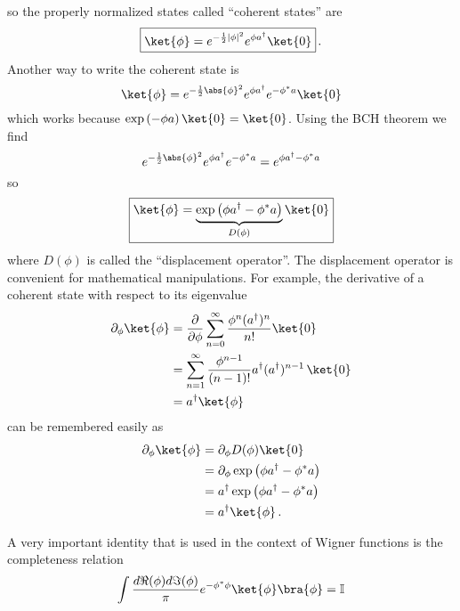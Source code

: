 so the properly normalized states called ``coherent states'' are
\begin{equation}
  \boxed{
    \ket{\phi} = e^{-\frac{1}{2} \lvert \phi \vert^2 } e^{\phi a^\dagger} \ket{0}
  }
  \, .
\end{equation}
Another way to write the coherent state is
\begin{equation*}
  \ket{\phi} = e^{-\frac{1}{2} \abs{\phi}^2} e^{\phi a^\dagger} e^{-\phi^* a} \ket{0}
\end{equation*}
which works because $\exp \left( -\phi a \right) \ket{0} = \ket{0}$.
Using the BCH theorem we find
\begin{equation*}
  e^{-\frac{1}{2} \abs{\phi}^2} e^{\phi a^\dagger} e^{-\phi^* a}
  = e^{\phi a^\dagger - \phi^* a}
\end{equation*}
so
\begin{equation}
  \boxed{
    \ket{\phi} = \underbrace{\exp \left( \phi a^\dagger - \phi^* a \right)}_{D(\phi)} \ket{0}
  }
\end{equation}
where $D(\phi)$ is called the ``displacement operator''.
The displacement operator is convenient for mathematical manipulations.
For example, the derivative of a coherent state with respect to its eigenvalue
\begin{align*}
  \partial_{\phi}\ket{\phi}
  &= \frac{\partial}{\partial \phi} \sum_{n=0}^\infty \frac{\phi^n (a^\dagger)^n}{n!} \ket{0} \\
  &= \sum_{n=1}^{\infty}\frac{\phi^{n-1}}{(n-1)!}a^{\dagger}(a^{\dagger})^{n-1} \, \ket{0} \\
  &= a^{\dagger}\ket{\phi}
\end{align*}
can be remembered easily as
\begin{align}
  \partial_\phi \ket{\phi}
  &= \partial_\phi D(\phi) \ket{0} \nonumber \\
  &= \partial_\phi \exp \left(\phi a^\dagger - \phi^* a \right) \nonumber \\
  &= a^\dagger \exp \left(\phi a^\dagger - \phi^* a \right) \nonumber \\
  &= a^\dagger \ket{\phi} \, .
\end{align}


A very important identity that is used in the context of Wigner functions
is the completeness relation
\begin{equation}
  \int \frac{d\Re(\phi)d\Im(\phi)}{\pi} e^{-\phi^{*}\phi}\ket{\phi}\bra{\phi}
  = \mathbb{I}
\end{equation}

